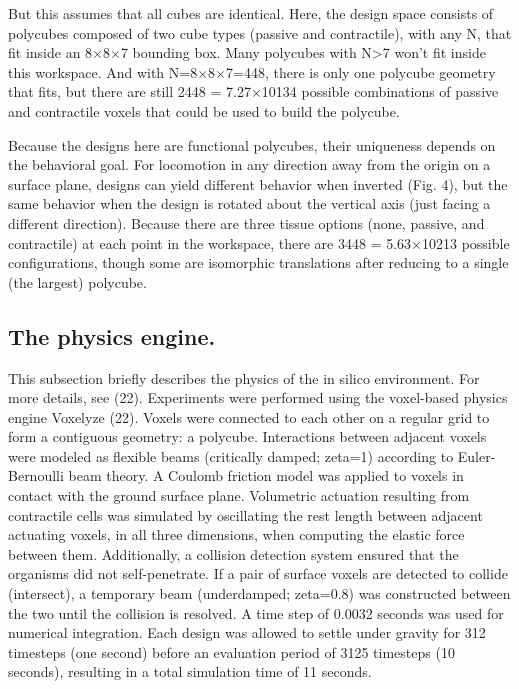 But this assumes that all cubes are identical. Here, the design space consists of polycubes composed of two cube types (passive and contractile), with any N, that fit inside an 8{$\times$}8{$\times$}7 bounding box. Many polycubes with N>7 won't fit inside this workspace. And with N=8{$\times$}8{$\times$}7=448, there is only one polycube geometry that fits, but there are still 2448 = 7.27{$\times$}10134 possible combinations of passive and contractile voxels that could be used to build the polycube.

Because the designs here are functional polycubes, their uniqueness depends on the behavioral goal. For locomotion in any direction away from the origin on a surface plane, designs can yield different behavior when inverted (Fig. 4), but the same behavior when the design is rotated about the vertical axis (just facing a different direction). Because there are three tissue options (none, passive, and contractile) at each point in the workspace, there are 3448 = 5.63{$\times$}10213 possible configurations, though some are isomorphic translations after reducing to a single (the largest) polycube.


\subsection*{The physics engine.}

This subsection briefly describes the physics of the in silico environment. 
For more details, see (22).
Experiments were performed using the voxel-based physics engine Voxelyze (22). 
Voxels were connected to each other on a regular grid to form a contiguous geometry: a polycube. 
Interactions between adjacent voxels were modeled as flexible beams (critically damped; zeta=1) according to Euler-Bernoulli beam theory. 
A Coulomb friction model was applied to voxels in contact with the ground surface plane. 
Volumetric actuation resulting from contractile cells was simulated by oscillating the rest length between adjacent actuating voxels, in all three dimensions, when computing the elastic force between them.
Additionally, a collision detection system ensured that the organisms did not self-penetrate. 
If a pair of surface voxels are detected to collide (intersect), a temporary beam (underdamped; zeta=0.8) was constructed between the two until the collision is resolved. 
A time step of 0.0032 seconds was used for numerical integration. Each design was allowed to settle under gravity for 312 timesteps (one second) before an evaluation period of 3125 timesteps (10 seconds), resulting in a total simulation time of 11 seconds.



